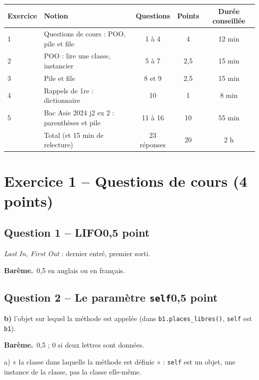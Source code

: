 \documentclass[11pt, a4paper]{exam}
\newcommand{\code}[1]{\texttt{#1}}
\newcommand{\Qt}[2]{\par\needspace{10\baselineskip}\subsection*{#1\hfill{\normalfont\small #2}}}
\newcommand{\bareme}[1]{\par\noindent\textbf{Barème.}\ #1\par\smallskip}
\begin{document}
\begin{center}\small
\begin{tabular}{|l|l|c|c|c|}\hline
Exercice & Notion & Questions & Points & Durée conseillée \\\hline
1 & Questions de cours : POO, pile et file & 1 à 4 & 4 & 12 min \\\hline
2 & POO : lire une classe, instancier & 5 à 7 & 2,5 & 15 min \\\hline
3 & Pile et file & 8 et 9 & 2,5 & 15 min \\\hline
4 & Rappels de 1re : dictionnaire & 10 & 1 & 8 min \\\hline
5 & Bac Asie 2024 j2 ex 2 : parenthèses et pile & 11 à 16 & 10 & 55 min \\\hline
 & Total (et 15 min de relecture) & 23 réponses & 20 & 2 h \\\hline
\end{tabular}
\end{center}

\section*{Exercice 1 -- Questions de cours (4 points)}

\Qt{Question 1 -- LIFO}{0,5 point}
\begin{reponse}
\textit{Last In, First Out} : dernier entré, premier sorti.
\end{reponse}
\bareme{0,5 en anglais ou en français.}

\Qt{Question 2 -- Le paramètre \code{self}}{0,5 point}
\begin{reponse}
\textbf{b)} l'objet sur lequel la méthode est appelée (dans \code{b1.places\_libres()}, \code{self} est \code{b1}).
\end{reponse}
\bareme{0,5 ; 0 si deux lettres sont données.}
\begin{erreur}
a) « la classe dans laquelle la méthode est définie » : \code{self} est un objet, une instance de la classe, pas la classe elle-même.
\end{erreur}
\end{document}
